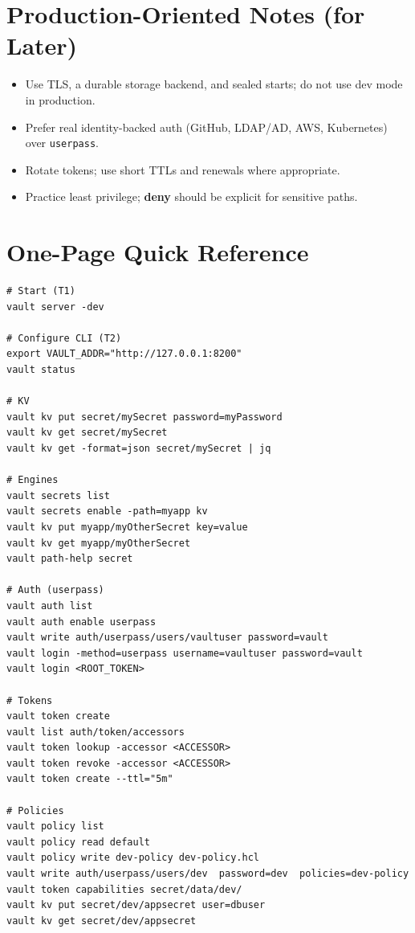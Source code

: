 \documentclass[11pt]{article}
\begin{document}
\section{Production-Oriented Notes (for Later)}
\begin{itemize}[itemsep=4pt]
  \item Use TLS, a durable storage backend, and sealed starts; do not use dev mode in production.
  \item Prefer real identity-backed auth (GitHub, LDAP/AD, AWS, Kubernetes) over \texttt{userpass}.
  \item Rotate tokens; use short TTLs and renewals where appropriate.
  \item Practice least privilege; \textbf{deny} should be explicit for sensitive paths.
\end{itemize}

\section*{One-Page Quick Reference}
\begin{verbatim}
# Start (T1)
vault server -dev

# Configure CLI (T2)
export VAULT_ADDR="http://127.0.0.1:8200"
vault status

# KV
vault kv put secret/mySecret password=myPassword
vault kv get secret/mySecret
vault kv get -format=json secret/mySecret | jq

# Engines
vault secrets list
vault secrets enable -path=myapp kv
vault kv put myapp/myOtherSecret key=value
vault kv get myapp/myOtherSecret
vault path-help secret

# Auth (userpass)
vault auth list
vault auth enable userpass
vault write auth/userpass/users/vaultuser password=vault
vault login -method=userpass username=vaultuser password=vault
vault login <ROOT_TOKEN>

# Tokens
vault token create
vault list auth/token/accessors
vault token lookup -accessor <ACCESSOR>
vault token revoke -accessor <ACCESSOR>
vault token create --ttl="5m"

# Policies
vault policy list
vault policy read default
vault policy write dev-policy dev-policy.hcl
vault write auth/userpass/users/dev  password=dev  policies=dev-policy
vault token capabilities secret/data/dev/
vault kv put secret/dev/appsecret user=dbuser
vault kv get secret/dev/appsecret
\end{verbatim}
\end{document}
